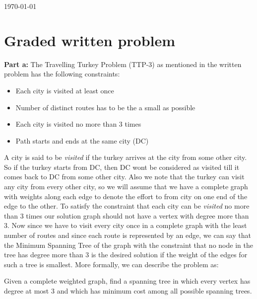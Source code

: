 \documentclass[8pt]{article}
\begin{document}
\hfill \small{\today} \\
\setlength{\fboxrule}{.5mm}\setlength{\fboxsep}{1.2mm}
\newlength{\boxlength}\setlength{\boxlength}{\textwidth}
\addtolength{\boxlength}{-4mm}
\begin{center}\end{center}
\vspace{5mm}

\section{Graded written problem}

\textbf{Part a:} The Travelling Turkey Problem (TTP-3) as mentioned in the written problem has the following constraints:
\begin{itemize}
\item Each city is visited at least once
\item Number of distinct routes has to be the a small as possible
\item Each city is visited no more than 3 times
\item Path starts and ends at the same city (DC)
\end{itemize}

A city is said to be \textit{visited} if the turkey arrives at the city from some other city. So if the turkey
starts from DC, then DC wont be considered as visited till it comes back to DC from some other city. Also we
note that the turkey can visit any city from every other city, so we will assume that we have a complete graph
with weights along each edge to denote the effort to from city on one end of the edge to the other. To satisfy
the constraint that each city can be \textit{visited} no more than 3 times our solution graph should not have a vertex with 
degree more than 3. Now since we have to visit every city once in a complete graph with the least number of routes
and since each route is represented by an edge, we can say that the Minimum Spanning Tree of the graph with the
constraint that no node in the tree has degree more than 3 is the desired solution if the weight of the edges for
such a tree is smallest. More formally, we can describe the problem as:

Given a complete weighted graph, find a spanning tree in which every vertex has degree at most 3 and which has minimum
cost among all possible spanning trees.
\end{document}
